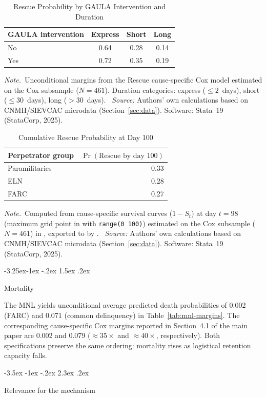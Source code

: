 \documentclass[12pt]{article}
\makeatletter
\numberwithin{equation}{section}
\numberwithin{table}{section}
\renewcommand\section{\@startsection {section}{1}{\z@}%
                                   {-3.5ex \@plus -1ex \@minus -.2ex}%
                                   {2.3ex \@plus.2ex}%
                                   {\normalfont\Large\bfseries\raggedright}}
\renewcommand\subsection{\@startsection{subsection}{2}{\z@}%
                                     {-3.25ex\@plus -1ex \@minus -.2ex}%
                                     {1.5ex \@plus .2ex}%
                                     {\normalfont\large\bfseries\raggedright}}
\newcommand{\tabnote}{\par\addvspace{0.4em}\noindent\emph{Note.}}
\newcommand{\tabsource}{\ \textit{Source:} Authors' own calculations based on
CNMH/SIEVCAC microdata (Section~\ref{sec:data}). Software: Stata~19
(StataCorp, 2025).}
\makeatother
\begin{document}
\begin{table}[t]
\centering
\caption{Rescue Probability by GAULA Intervention and Duration}
\label{tab:cox-gaula}
\small
\begin{tabular}{@{}lccc@{}}
\toprule
GAULA intervention & Express & Short & Long \\
\midrule
No & 0.64 & 0.28 & 0.14 \\
Yes & 0.72 & 0.35 & 0.19 \\
\bottomrule
\end{tabular}
\tabnote\ Unconditional margins from the Rescue cause-specific Cox model
estimated on the Cox subsample ($N=461$). Duration categories: express
($\le 2$~days), short ($\le 30$~days), long ($>30$~days).
\tabsource
\end{table}

\begin{table}[t]
\centering
\caption{Cumulative Rescue Probability at Day 100}
\label{tab:cox-cumul}
\small
\begin{tabular}{@{}lr@{}}
\toprule
Perpetrator group & $\Pr(\text{Rescue by day 100})$ \\
\midrule
Paramilitaries & 0.33 \\
ELN & 0.28 \\
FARC & 0.27 \\
\bottomrule
\end{tabular}
\tabnote\ Computed from cause-specific survival curves ($1-S_t$) at day
$t=98$ (maximum grid point in  with \texttt{range(0 100)})
estimated on the Cox subsample ($N=461$) in ,
exported to  by .
\tabsource
\end{table}

\subsection{Mortality}

The MNL yields unconditional average predicted death probabilities of 0.002
(FARC) and 0.071 (common delinquency) in Table~\ref{tab:mnl-margins}. The
corresponding cause-specific Cox margins reported in Section~4.1 of the main
paper are 0.002 and 0.079 (${\approx}35\times$ and ${\approx}40\times$,
respectively). Both specifications preserve the same ordering: mortality rises
as logistical retention capacity falls.

\section{Relevance for the mechanism}
\label{sec:relevance}
\end{document}

